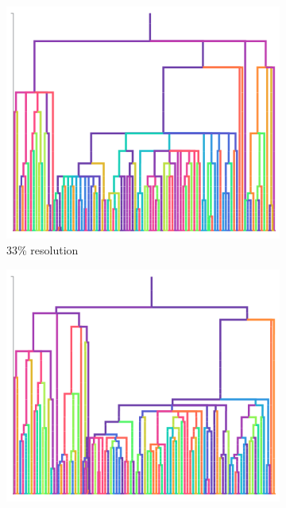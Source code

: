 \begin{figure}
  \centering
  \begin{subfigure}[b]{\linewidth}
    \centering
    \includegraphics[width=\textwidth, height=0.16\textheight]{img/plain_resolution_3} \caption{%
      33\% resolution}
    \label{fig:plain-perfect-and-reconstruction-phylogenies:resolution_3}
  \end{subfigure}
  \begin{subfigure}[b]{\linewidth}
    \centering
    \includegraphics[width=\textwidth, height=0.16\textheight]{img/plain_resolution_10}

\end{subfigure}
\end{figure}
